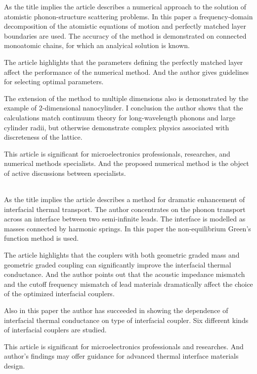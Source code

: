 \documentclass[main.tex]{subfiles}
\begin{document}
\setcounter{subsection}{5}
As the title implies the article describes a numerical approach to the solution of atomistic phonon-structure scattering problems.
In this paper a frequency-domain decomposition of the atomistic equations of motion and perfectly matched layer boundaries are used.
The accuracy of the method is demonstrated on connected monoatomic chains, for which an analyical solution is known.\par
The article highlights that the parameters defining the perfectly matched layer affect the performance of the numerical method.
And the author gives guidelines for selecting optimal parameters.\par
The extension of the method to multiple dimensions also is demonstrated by the example of 2-dimensional nanocylinder.
I conclusion the author shows that the calculations match continuum theory for long-wavelength phonons and large cylinder radii, but otherwise demonstrate complex physics associated with discreteness of the lattice.\par
This article is significant for microelectronics professionals, researches, and numerical methods specialists.
And the proposed numerical method is the object of active discussions between specialists.
\ \\\\
\newpage


\setcounter{subsection}{6}
As the title implies the article describes a method for dramatic enhancement of interfacial thermal transport.
The author concentrates on the phonon transport across an interface between two semi-infinite leads.
The interface is modelled as masses connected by harmonic springs.
In this paper the non-equilibrium Green's function method is used.\par
The article highlights that the couplers with both geometric graded mass and geometric graded coupling can significantly improve the interfacial thermal conductance.
And the author points out that the acoustic impedance mismatch and the cutoff frequency mismatch of lead materials dramatically affect the choice of the optimized interfacial couplers.\par
Also in this paper the author has succeeded in showing the dependence of interfacial thermal conductance on type of interfacial coupler.
Six different kinds of interfacial couplers are studied.\par
This article is significant for microelectronics professionals and researches.
And author's findings may offer guidance for advanced thermal interface materials design.
\ \\\\
\newpage
\end{document}
